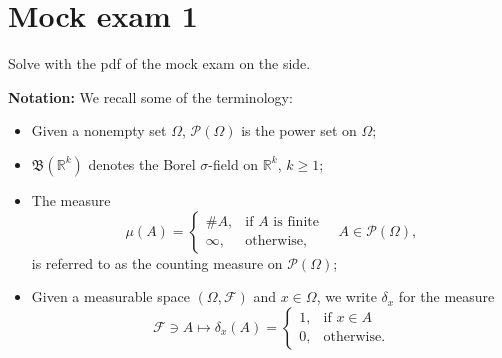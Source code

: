 \chapter{Mock exam 1}%
\label{cha:Mock exam 1}
Solve with the pdf of the mock exam on the side.

\textbf{Notation:} We recall some of the terminology:
\begin{itemize}
    \item Given a nonempty set $\Omega$, $\mathcal{P}(\Omega)$ is the power set on $\Omega$;
    \item $\mathfrak{B}(\mathbb{R}^k)$ denotes the Borel $\sigma$-field on $\mathbb{R}^k$, $k \geq 1$;
    \item The measure
    \[
    \mu(A) = 
    \begin{cases} 
    \#A, & \text{if } A \text{ is finite} \\
    \infty, & \text{otherwise},
    \end{cases}
    \quad A \in \mathcal{P}(\Omega),
    \]
    is referred to as the counting measure on $\mathcal{P}(\Omega)$;
    \item Given a measurable space $(\Omega, \mathcal{F})$ and $x \in \Omega$, we write $\delta_x$ for the measure
    \[
    \mathcal{F} \ni A \mapsto \delta_x(A) = 
    \begin{cases} 
    1, & \text{if } x \in A \\
    0, & \text{otherwise}.
    \end{cases}
    \]
\end{itemize}


